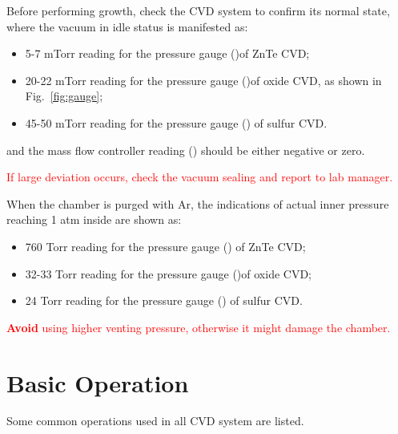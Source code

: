 Before performing growth, check the CVD system to confirm its normal state, where the vacuum in idle status is manifested as:
\begin{itemize}
\item 5-7 mTorr reading for the pressure gauge ()of ZnTe CVD;
\item 20-22 mTorr reading for the pressure gauge ()of oxide CVD, as shown in Fig.~\ref{fig:gauge};
\item 45-50 mTorr reading for the pressure gauge () of sulfur CVD. 
\end{itemize} 
and the mass flow controller reading () should be either negative or zero.

\textcolor{red}{If large deviation occurs, check the vacuum sealing and report to lab manager.} 

When the chamber is purged with Ar, the indications of actual inner pressure reaching 1 atm inside are shown as: 
\begin{itemize}
\item 760 Torr reading for the pressure gauge () of ZnTe CVD;
\item 32-33 Torr reading for the pressure gauge ()of oxide CVD;
\item 24 Torr reading for the pressure gauge () of sulfur CVD.  
\end{itemize} 

\textcolor{red}{\textbf{Avoid} using higher venting pressure, otherwise it might damage the chamber.} 




\section{Basic Operation}
Some common operations used in all CVD system are listed. 
